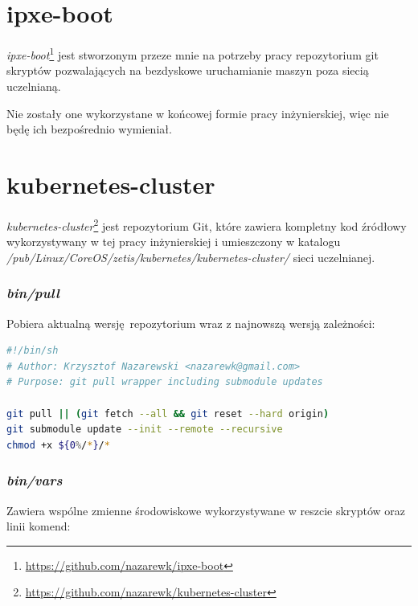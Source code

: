 \documentclass[a4paper,12pt,twoside,openany]{report}
\DeclareRobustCommand{\href}[2]{#2\footnote{\url{#1}}}
\begin{document}
\hypertarget{ipxe-boot}{%
\section{ipxe-boot}\label{ipxe-boot}}

\href{https://github.com/nazarewk/ipxe-boot}{\emph{ipxe-boot}} jest
stworzonym przeze mnie na potrzeby pracy repozytorium git skryptów
pozwalających na bezdyskowe uruchamianie maszyn poza siecią uczelnianą.

Nie zostały one wykorzystane w końcowej formie pracy inżynierskiej, więc
nie będę ich bezpośrednio wymieniał.

\hypertarget{kubernetes-cluster}{%
\section{kubernetes-cluster}\label{kubernetes-cluster}}

\href{https://github.com/nazarewk/kubernetes-cluster}{\emph{kubernetes-cluster}}
jest repozytorium Git, które zawiera kompletny kod źródłowy
wykorzystywany w tej pracy inżynierskiej i umieszczony w katalogu
\emph{/pub/Linux/CoreOS/zetis/kubernetes/kubernetes-cluster/} sieci
uczelnianej.

\newpage

\hypertarget{binpull}{%
\subsubsection{\texorpdfstring{\emph{bin/pull}}{bin/pull}}\label{binpull}}

Pobiera aktualną wersję~repozytorium wraz z najnowszą wersją zależności:

\begin{lstlisting}[language=bash]
#!/bin/sh
# Author: Krzysztof Nazarewski <nazarewk@gmail.com>
# Purpose: git pull wrapper including submodule updates

git pull || (git fetch --all && git reset --hard origin)
git submodule update --init --remote --recursive
chmod +x ${0%/*}/*
\end{lstlisting}

\hypertarget{binvars}{%
\subsubsection{\texorpdfstring{\emph{bin/vars}}{bin/vars}}\label{binvars}}

Zawiera wspólne zmienne środowiskowe wykorzystywane w reszcie skryptów
oraz linii komend:
\end{document}
